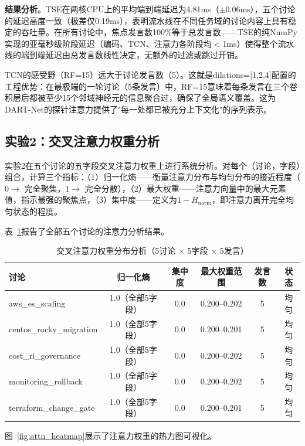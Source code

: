 \documentclass[12pt,a4paper]{ctexart}
\begin{document}
\textbf{结果分析}。TSE在两核CPU上的平均端到端延迟为4.81ms（$\pm$0.06ms），五个讨论的延迟高度一致（极差仅0.19ms），表明流水线在不同任务域的讨论内容上具有稳定的吞吐量。在所有讨论中，焦点发言数100\%等于总发言数——TSE的纯NumPy实现的亚毫秒级阶段延迟（编码、TCN、注意力各阶段均$<$1ms）使得整个流水线的端到端延迟由总发言数线性决定，无额外的过滤或跳过开销。

TCN的感受野（RF=15）远大于讨论发言数（5）。这就是dilations=[1,2,4]配置的工程优势：在最极端的一轮讨论（5条发言）中，RF=15意味着每条发言在三个卷积层后都被至少15个邻域神经元的信息聚合过，确保了全局语义覆盖。这为DART-Net的探针注意力提供了"每一处都已被充分上下文化"的序列表示。

\subsection{实验2：交叉注意力权重分析}

实验2在五个讨论的五字段交叉注意力权重上进行系统分析。对每个（讨论，字段）组合，计算三个指标：（1）归一化熵——衡量注意力分布与均匀分布的接近程度（$0 \to$ 完全聚集，$1 \to$ 完全分散），（2）最大权重——注意力向量中的最大元素值，指示最强的聚焦点，（3）集中度——定义为$1 - H_{\text{norm}}$，即注意力离开完全均匀状态的程度。

表~\ref{tab:attention}报告了全部五个讨论的注意力分析结果。

\begin{table}[H]
\centering
\caption{交叉注意力权重分布分析（5讨论 $\times$ 5字段 $\times$ 5发言）}
\label{tab:attention}
\renewcommand{\arraystretch}{1.1}
\begin{tabular}{lccccc}
\toprule
讨论 & 归一化熵 & 集中度 & 最大权重范围 & 发言数 & 状态 \\
\midrule
aws\_es\_scaling & 1.0（全部5字段） & 0.0 & 0.200--0.202 & 5 & 均匀 \\
centos\_rocky\_migration & 1.0（全部5字段） & 0.0 & 0.200--0.201 & 5 & 均匀 \\
cost\_ri\_governance & 1.0（全部5字段） & 0.0 & 0.200--0.202 & 5 & 均匀 \\
monitoring\_rollback & 1.0（全部5字段） & 0.0 & 0.200--0.202 & 5 & 均匀 \\
terraform\_change\_gate & 1.0（全部5字段） & 0.0 & 0.200--0.201 & 5 & 均匀 \\
\bottomrule
\end{tabular}
\end{table}

图~\ref{fig:attn_heatmap}展示了注意力权重的热力图可视化。
\end{document}
